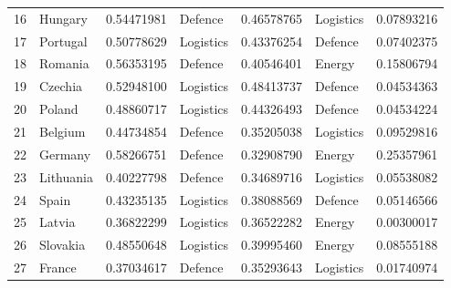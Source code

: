 \begin{longtable}{@{}rl r l r l r@{}}
  16 & Hungary & 0.54471981 & Defence & 0.46578765 & Logistics & 0.07893216 \\
  17 & Portugal & 0.50778629 & Logistics & 0.43376254 & Defence & 0.07402375 \\
  18 & Romania & 0.56353195 & Defence & 0.40546401 & Energy & 0.15806794 \\
  19 & Czechia & 0.52948100 & Logistics & 0.48413737 & Defence & 0.04534363 \\
  20 & Poland & 0.48860717 & Logistics & 0.44326493 & Defence & 0.04534224 \\
  21 & Belgium & 0.44734854 & Defence & 0.35205038 & Logistics & 0.09529816 \\
  22 & Germany & 0.58266751 & Defence & 0.32908790 & Energy & 0.25357961 \\
  23 & Lithuania & 0.40227798 & Defence & 0.34689716 & Logistics & 0.05538082 \\
  24 & Spain & 0.43235135 & Logistics & 0.38088569 & Defence & 0.05146566 \\
  25 & Latvia & 0.36822299 & Logistics & 0.36522282 & Energy & 0.00300017 \\
  26 & Slovakia & 0.48550648 & Logistics & 0.39995460 & Energy & 0.08555188 \\
  27 & France & 0.37034617 & Defence & 0.35293643 & Logistics & 0.01740974 \\
\end{longtable}